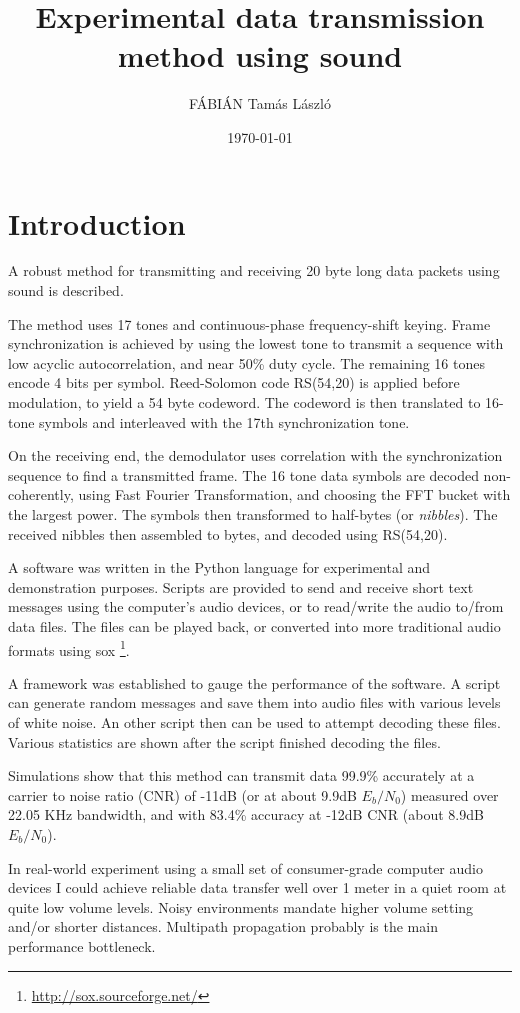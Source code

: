 \documentclass[a4paper]{article}
\title{Experimental data transmission method using sound}
\author{FÁBIÁN Tamás László}
\date{\today}
\begin{document}
\maketitle

\section{Introduction}

A robust method for transmitting and receiving 20 byte long data 
packets using sound is described.

The method uses 17 tones and continuous-phase frequency-shift keying. 
Frame synchronization is achieved by using the lowest tone to transmit 
a sequence with low acyclic autocorrelation, and near 50\% duty cycle. 
The remaining 16 tones encode 4 bits per symbol. Reed-Solomon code 
RS(54,20) is applied before modulation, to yield a 54 byte codeword. 
The codeword is then translated to 16-tone symbols and interleaved with
the 17th synchronization tone.

On the receiving end, the demodulator uses correlation with the
synchronization sequence to find a transmitted frame. The 16 tone data
symbols are decoded non-coherently, using Fast Fourier Transformation,
and choosing the FFT bucket with the largest power. The symbols then
transformed to half-bytes (or \textit{nibbles}). The received nibbles
then assembled to bytes, and decoded using RS(54,20).

A software was written in the Python language for experimental and 
demonstration purposes. Scripts are provided to send and receive short 
text messages using the computer's audio devices, or to read/write the 
audio to/from data files. The files can be played back, or converted 
into more traditional audio formats using sox
\footnote{\url{http://sox.sourceforge.net/}}.

A framework was established to gauge the performance of the software. A 
script can generate random messages and save them into audio files with 
various levels of white noise. An other script then can be used to 
attempt decoding these files. Various statistics are shown after the 
script finished decoding the files.

Simulations show that this method can transmit data 99.9\% accurately 
at a carrier to noise ratio (CNR) of -11dB (or at about 9.9dB 
$E_b/N_0$) measured over 22.05 KHz bandwidth, and with 83.4\% accuracy 
at -12dB CNR (about 8.9dB $E_b/N_0$).

In real-world experiment using a small set of consumer-grade computer 
audio devices I could achieve reliable data transfer well over 1 meter 
in a quiet room at quite low volume levels. Noisy environments mandate 
higher volume setting and/or shorter distances. Multipath propagation
probably is the main performance bottleneck.
\end{document}
